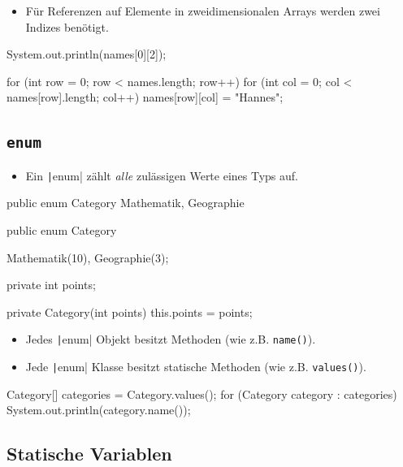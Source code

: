 \documentclass[a4paper,10pt, dvipsnames]{report}
\begin{document}
\begin{itemize}
	\item Für Referenzen auf Elemente in zweidimensionalen Arrays werden zwei Indizes benötigt.
\end{itemize}

\begin{javacodebox}
System.out.println(names[0][2]);

for (int row = 0; row < names.length; row++) {
	for (int col = 0; col < names[row].length; col++) {
		names[row][col] = "Hannes";
	}
}
\end{javacodebox}

\subsection{\texttt{enum}}

\begin{itemize}
	\item Ein \texttt|enum| zählt \textit{alle} zulässigen Werte eines Typs auf.
\end{itemize}

\begin{javacodebox}
public enum Category {
	Mathematik, Geographie
}
\end{javacodebox}

\begin{javacodebox}
public enum Category {
	Mathematik(10), Geographie(3);

	private int points;

	private Category(int points) {
		this.points = points;
	}
}
\end{javacodebox}

\begin{itemize}
	\item Jedes \texttt|enum| Objekt besitzt Methoden (wie z.B. \texttt{name()}).
	\item Jede \texttt|enum| Klasse besitzt statische Methoden (wie z.B. \texttt{values()}).
\end{itemize}

\begin{javacodebox}
Category[] categories = Category.values();
for (Category category : categories) {
	System.out.println(category.name());
}
\end{javacodebox}

\subsection{Statische Variablen}
\end{document}
